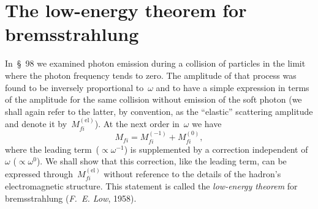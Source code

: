 \section{The low-energy theorem for bremsstrahlung}

In~\S~98 we examined photon emission during a collision of particles in the limit where the photon frequency tends to zero. The amplitude of that process was found to be inversely proportional to~$\omega$ and to have a simple expression in terms of the amplitude for the same collision without emission of the soft photon (we shall again refer to the latter, by convention, as the ``elastic'' scattering amplitude and denote it by~$M_{fi}^{(\mathrm{el})}$). At the next order in~$\omega$ we have
\begin{equation}
M_{fi}=M_{fi}^{(-1)}+M_{fi}^{(0)},
\tag{140.1}
\end{equation}
where the leading term~($\propto\omega^{-1}$) is supplemented by a correction independent of~$\omega$ ($\propto\omega^0$). We shall show that this correction, like the leading term, can be expressed through~$M_{fi}^{(\mathrm{el})}$ without reference to the details of the hadron's electromagnetic structure. This statement is called the \emph{low-energy theorem} for bremsstrahlung (\emph{F.~E. Low}, 1958).

